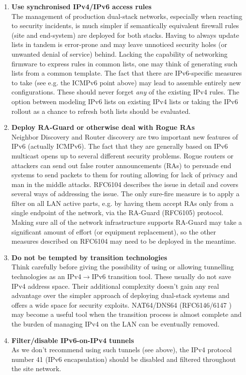 \begin{enumerate}
\item {\bf Use synchronised IPv4/IPv6 access rules} \\
The management of production dual-stack networks, especially when reacting
to security incidents, is much simpler if semantically equivalent firewall rules
(site and end-system) are deployed for both stacks. Having to always
update lists in tandem is error-prone and may leave unnoticed security holes
(or unwanted denial of service) behind. Lacking the capability
of networking firmware to express rules in common lists, one may think
of generating such lists from a common template. The fact that there are
IPv6-specific measures to take (see e.g. the ICMPv6 point above) may lead
to assemble entirely new configurations. These should never forget {\it any}
of the existing IPv4 rules. The option between modeling IPv6 lists on
existing IPv4 lists or taking the IPv6 rollout as a chance to refresh
both lists should be evaluated.


\item {\bf Deploy RA-Guard or otherwise deal with Rogue RAs} \\
Neighbor Discovery and Router discovery are two important new features of IPv6
(actually ICMPv6).
The fact that they are generally based on IPv6 multicast opens up to several
different security problems. Rogue routers or attackers can send out false router
announcements (RAs) to persuade end systems to send packets to them
for routing allowing for lack of privacy and man in the middle attacks.
RFC6104 describes the issue in detail and covers 
several ways of addressing the issue. The only sure-fire measure is
to apply a filter on all LAN active parts, e.g. by having
them accept RAs only from a single endpoint of the network, 
via the RA-Guard (RFC6105) protocol. Making sure all of the network infrastructure
supports RA-Guard may take a significant amount of effort (or equipment
replacement), so the other measures described on RFC6104 may need to
be deployed in the meantime.


\item {\bf Do not be tempted by transition technologies} \\
Think carefully before giving the possibility of using or allowing 
tunnelling technologies as an IPv4$\rightarrow$IPv6 transition tool.
These usually do not save IPv4 address space. Their additional
complexity doesn't gain any real advantage over the simpler
approach of deploying dual-stack systems and offers a wide space
for security exploits. NAT64/DNS64 (RFC6146/6147 \cite{rfc}) may become
a useful tool when the transition process is almost complete and the burden
of managing IPv4 on the LAN can be eventually removed.

\item {\bf Filter/disable IPv6-on-IPv4 tunnels} \\
As we don't recommend using such tunnels (see above), the IPv4 protocol
number 41 (IPv6 encapsulation) should be disabled and filtered throughout
the site network.

\end{enumerate}



